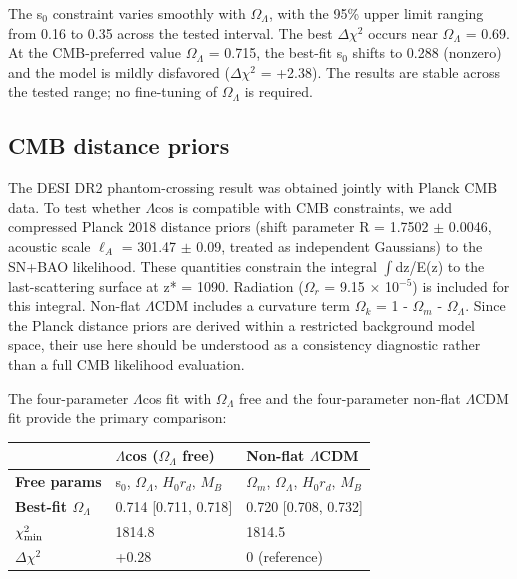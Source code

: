 The s$_0$ constraint varies smoothly with $\Omega_\Lambda$, with the 95\% upper limit
ranging from 0.16 to 0.35 across the tested interval. The best $\Delta\chi^2$
occurs near $\Omega_\Lambda$ = 0.69. At the CMB-preferred value $\Omega_\Lambda$ = 0.715, the
best-fit s$_0$ shifts to 0.288 (nonzero) and the model is mildly disfavored
($\Delta\chi^2$ = +2.38). The results are stable across the tested range; no
fine-tuning of $\Omega_\Lambda$ is required.

\subsection{CMB distance priors}\label{sec:cmb-priors}

The DESI DR2 phantom-crossing result was obtained jointly with Planck
CMB data. To test whether $\Lambda$cos is compatible with CMB constraints, we
add compressed Planck 2018 distance priors (shift parameter R = 1.7502 $\pm$
0.0046, acoustic scale $\ell_A$ = 301.47 $\pm$ 0.09, treated as independent
Gaussians) to the SN+BAO likelihood. These quantities constrain the
integral $\int$dz/E(z) to the last-scattering surface at z* = 1090. Radiation
($\Omega_r$ = 9.15 $\times$ 10$^{-5}$) is included for this integral. Non-flat $\Lambda$CDM
includes a curvature term $\Omega_k$ = 1 - $\Omega_m$ - $\Omega_\Lambda$. Since the Planck
distance priors are derived within a restricted background model space,
their use here should be understood as a consistency diagnostic rather
than a full CMB likelihood evaluation.

The four-parameter $\Lambda$cos fit with $\Omega_\Lambda$ free and the four-parameter
non-flat $\Lambda$CDM fit provide the primary comparison:

{\def\LTcaptype{none} %
\begin{table}[!htb]
\centering\footnotesize
\begin{tabular}{@{}lll@{}}
\toprule
& $\Lambda$cos ($\Omega_\Lambda$ free) & Non-flat $\Lambda$CDM \\
\midrule

\textbf{Free params} & s$_0$, $\Omega_\Lambda$, $H_0 r_d$, $M_B$ & $\Omega_m$, $\Omega_\Lambda$, $H_0 r_d$,
$M_B$ \\
\textbf{Best-fit $\Omega_\Lambda$} & 0.714 {[}0.711, 0.718{]} & 0.720 {[}0.708,
0.732{]} \\
\textbf{$\chi^2_{\rm min}$} & 1814.8 & 1814.5 \\
\textbf{$\Delta\chi^2$} & +0.28 & 0 (reference) \\
\bottomrule
\end{tabular}
\end{table}
}

